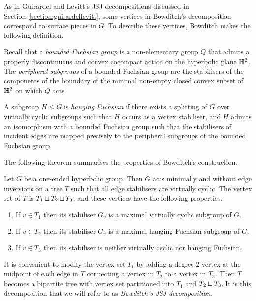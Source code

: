 As in Guirardel and Levitt's JSJ decompositions discussed in Section~\ref{section:guirardellevitt}, some vertices in Bowditch's decomposition correspond to surface pieces in $G$.
To describe these vertices, Bowditch makes the following definition.

\begin{definition}\label{definition:bounded_Fuchsian}
  Recall that a \emph{bounded Fuchsian group} is a non-elementary group $Q$ that admits a properly discontinuous and convex cocompact action on the hyperbolic plane $\mathbb{H}^2$.
  The \emph{peripheral subgroups} of a bounded Fuchsian group are the stabilisers of the components of the boundary of the minimal non-empty closed convex subset of $\mathbb{H}^2$ on which $Q$ acts. 
\end{definition}

\begin{definition}\label{definition:hanging_fuchsian}
  A subgroup $H \leq G$ is \emph{hanging Fuchsian} if there exists a splitting of $G$ over virtually cyclic subgroups such that $H$ occurs as a vertex stabiliser, and $H$ admits an isomorphism with a bounded Fuchsian group such that the stabilisers of incident edges are mapped precisely to the peripheral subgroups of the bounded Fuchsian group.
\end{definition}

The following theorem summarises the properties of Bowditch's construction.

\begin{theorem}\cite[Theorem 5.28]{bowditch98}\label{theorem:bowditch_JSJ}
  Let $G$ be a one-ended hyperbolic group. 
  Then $G$ acts minimally and without edge inversions on a tree $T$ such that all edge stabilisers are virtually cyclic.
  The vertex set of $T$ is $T_1 \sqcup T_2 \sqcup T_3$, and these vertices have the following properties.
  \begin{enumerate}
    \item If $v \in T_1$ then its stabiliser $G_v$ is a maximal virtually cyclic subgroup of $G$.
    \item If $v \in T_2$ then its stabiliser $G_v$ is a maximal hanging Fuchsian subgroup of $G$.
    \item If $v \in T_3$ then its stabiliser is neither virtually cyclic nor hanging Fuchsian.
  \end{enumerate}
\end{theorem}

\begin{remark} 
  It is convenient to modify the vertex set $T_1$ by adding a degree 2 vertex at the midpoint of each edge in $T$ connecting a vertex in $T_2$ to a vertex in $T_3$.
  Then $T$ becomes a bipartite tree with vertex set partitioned into $T_1$ and $T_2 \sqcup T_3$.
  It is this decomposition that we will refer to as \emph{Bowditch's JSJ decomposition.}
\end{remark}

